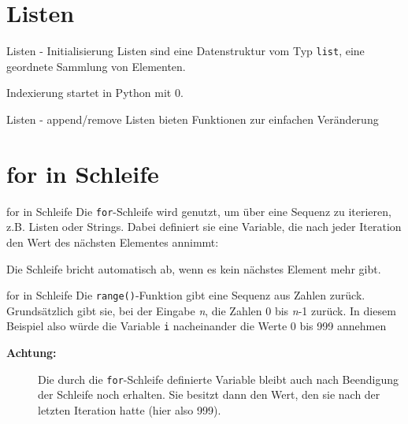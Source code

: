 \section{Listen}
\begin{frame}{Listen - Initialisierung}
	Listen sind eine Datenstruktur vom Typ \alert{\texttt{list}}, eine geordnete Sammlung von Elementen.
	
	Indexierung startet in Python mit 0.
	
\end{frame}
\begin{frame}{Listen - append/remove}
	Listen bieten Funktionen zur einfachen Veränderung
	
	
	
	
\end{frame}

\section{for in Schleife}
\begin{frame}{for in Schleife}
	Die \alert{\texttt{for}}-Schleife wird genutzt, um über eine Sequenz zu iterieren, z.B. Listen oder Strings. Dabei definiert sie eine Variable, die nach jeder Iteration den Wert des nächsten Elementes annimmt:
	
	
	Die Schleife bricht automatisch ab, wenn es kein nächstes Element mehr gibt.
\end{frame}

\begin{frame}{for in Schleife}
	Die \alert{\texttt{range()}}-Funktion gibt eine Sequenz aus Zahlen zurück. Grundsätzlich gibt sie, bei der Eingabe \textit{n}, die Zahlen 0 bis \textit{n}-1 zurück. In diesem Beispiel also würde die Variable \alert{\texttt{i}} nacheinander die Werte 0 bis 999 annehmen
	
	\begin{description}
		\item[\textbf{Achtung:}] Die durch die \alert{\texttt{for}}-Schleife definierte Variable bleibt auch nach Beendigung der Schleife noch erhalten. Sie besitzt dann den Wert, den sie nach der letzten Iteration hatte (hier also 999).
	\end{description}
\end{frame}

